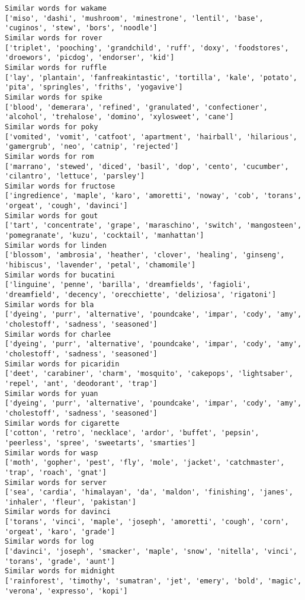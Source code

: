 \documentclass[11pt]{article}
\begin{document}
\begin{Verbatim}[commandchars=\\\{\}]
Similar words for wakame
['miso', 'dashi', 'mushroom', 'minestrone', 'lentil', 'base', 'cuginos', 'stew', 'bors', 'noodle']
Similar words for rover
['triplet', 'pooching', 'grandchild', 'ruff', 'doxy', 'foodstores', 'droewors', 'picdog', 'endorser', 'kid']
Similar words for ruffle
['lay', 'plantain', 'fanfreakintastic', 'tortilla', 'kale', 'potato', 'pita', 'springles', 'friths', 'yogavive']
Similar words for spike
['blood', 'demerara', 'refined', 'granulated', 'confectioner', 'alcohol', 'trehalose', 'domino', 'xylosweet', 'cane']
Similar words for poky
['vomited', 'vomit', 'catfoot', 'apartment', 'hairball', 'hilarious', 'gamergrub', 'neo', 'catnip', 'rejected']
Similar words for rom
['marrano', 'stewed', 'diced', 'basil', 'dop', 'cento', 'cucumber', 'cilantro', 'lettuce', 'parsley']
Similar words for fructose
['ingredience', 'maple', 'karo', 'amoretti', 'noway', 'cob', 'torans', 'orgeat', 'cough', 'davinci']
Similar words for gout
['tart', 'concentrate', 'grape', 'maraschino', 'switch', 'mangosteen', 'pomegranate', 'kuzu', 'cocktail', 'manhattan']
Similar words for linden
['blossom', 'ambrosia', 'heather', 'clover', 'healing', 'ginseng', 'hibiscus', 'lavender', 'petal', 'chamomile']
Similar words for bucatini
['linguine', 'penne', 'barilla', 'dreamfields', 'fagioli', 'dreamfield', 'decency', 'orecchiette', 'deliziosa', 'rigatoni']
Similar words for bla
['dyeing', 'purr', 'alternative', 'poundcake', 'impar', 'cody', 'amy', 'cholestoff', 'sadness', 'seasoned']
Similar words for charlee
['dyeing', 'purr', 'alternative', 'poundcake', 'impar', 'cody', 'amy', 'cholestoff', 'sadness', 'seasoned']
Similar words for picaridin
['deet', 'carabiner', 'charm', 'mosquito', 'cakepops', 'lightsaber', 'repel', 'ant', 'deodorant', 'trap']
Similar words for yuan
['dyeing', 'purr', 'alternative', 'poundcake', 'impar', 'cody', 'amy', 'cholestoff', 'sadness', 'seasoned']
Similar words for cigarette
['cotton', 'retro', 'necklace', 'ardor', 'buffet', 'pepsin', 'peerless', 'spree', 'sweetarts', 'smarties']
Similar words for wasp
['moth', 'gopher', 'pest', 'fly', 'mole', 'jacket', 'catchmaster', 'trap', 'roach', 'gnat']
Similar words for server
['sea', 'cardia', 'himalayan', 'da', 'maldon', 'finishing', 'janes', 'inhaler', 'fleur', 'pakistan']
Similar words for davinci
['torans', 'vinci', 'maple', 'joseph', 'amoretti', 'cough', 'corn', 'orgeat', 'karo', 'grade']
Similar words for log
['davinci', 'joseph', 'smacker', 'maple', 'snow', 'nitella', 'vinci', 'torans', 'grade', 'aunt']
Similar words for midnight
['rainforest', 'timothy', 'sumatran', 'jet', 'emery', 'bold', 'magic', 'verona', 'expresso', 'kopi']

\end{Verbatim}
\end{document}

